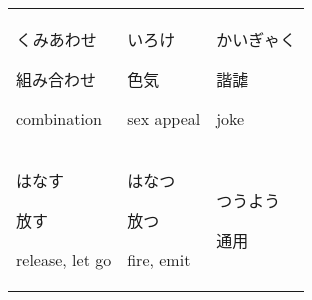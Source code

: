 \documentclass[12pt, a4j, landscape, dvipdfmx]{utarticle}
\begin{document}
    
    \begin{minipage}[t][0pt]{\linewidth }
        \noindent 
        \begin{tabular}{||p{5.5cm}||p{5.5cm}||p{5.5cm}||}
            \hhline{|t:=:t:=:t:=:t|} \rule{0pt}{3ex}
            \hspace*{-.4cm} {\LARGE くみあわせ}\newline
            \rule{0pt}{3ex} \hspace*{.4cm} {\small
            組み合わせ}\newline \rule{0pt}{3ex} \hspace*{.425cm}
            {\small combination}&\rule{0pt}{3ex}
            \hspace*{-.4cm} {\LARGE いろけ}\newline
            \rule{0pt}{3ex} \hspace*{.4cm} {\small
            色気}\newline \rule{0pt}{3ex} \hspace*{.425cm}
            {\small sex appeal}&\rule{0pt}{3ex}
            \hspace*{-.4cm} {\LARGE かいぎゃく}\newline
            \rule{0pt}{3ex} \hspace*{.4cm} {\small
            諧謔}\newline \rule{0pt}{3ex} \hspace*{.425cm}
            {\small joke}\tabularnewline
            \hhline{|:=::=::=:|} \rule{0pt}{3ex}
            \hspace*{-.4cm} {\LARGE はなす}\newline
            \rule{0pt}{3ex} \hspace*{.4cm} {\small
            放す}\newline \rule{0pt}{3ex} \hspace*{.425cm}
            {\small release, let go}&\rule{0pt}{3ex}
            \hspace*{-.4cm} {\LARGE はなつ}\newline
            \rule{0pt}{3ex} \hspace*{.4cm} {\small
            放つ}\newline \rule{0pt}{3ex} \hspace*{.425cm}
            {\small fire, emit}&\rule{0pt}{3ex}
            \hspace*{-.4cm} {\LARGE つうよう}\newline
            \rule{0pt}{3ex} \hspace*{.4cm} {\small
            通用}\newline \rule{0pt}{3ex} \hspace*{.425cm}

\end{tabular}
\end{minipage}
\end{document}
